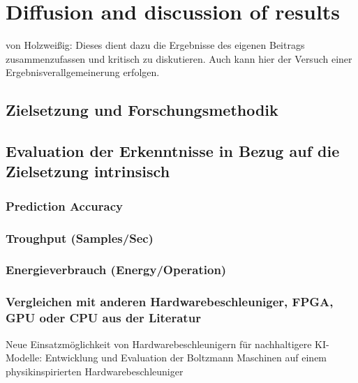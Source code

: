 \chapter{Diffusion and discussion of results}

von Holzweißig: Dieses dient dazu die Ergebnisse des eigenen Beitrags zusammenzufassen
und kritisch zu diskutieren. Auch kann hier der Versuch einer Ergebnisverallgemeinerung
erfolgen.

\section{Zielsetzung und Forschungsmethodik}
\section{Evaluation der Erkenntnisse in Bezug auf die Zielsetzung intrinsisch }
\subsection{Prediction Accuracy}
\subsection{Troughput (Samples/Sec)}
\subsection{Energieverbrauch (Energy/Operation)}
\subsection{Vergleichen mit anderen Hardwarebeschleuniger, FPGA, GPU oder CPU aus der Literatur}
Neue Einsatzmöglichkeit von Hardwarebeschleunigern
für nachhaltigere KI-Modelle: Entwicklung und
Evaluation der Boltzmann Maschinen auf einem
physikinspirierten Hardwarebeschleuniger